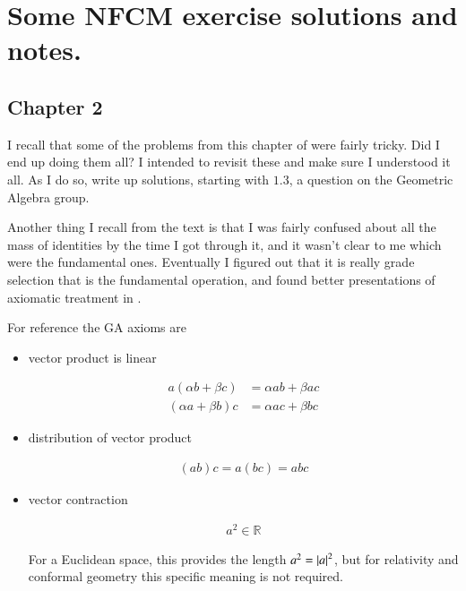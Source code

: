 \chapter{Some NFCM exercise solutions and notes. }
\label{chap:nfcmCh2}
\date{ Nov 27, 2008.  $RCSfile: nfcmCh2.tex,v $ Last $Revision: 1.12 $ $Date: 2009/08/20 02:40:11 $ }

\section{Chapter 2 }

I recall that some of the problems from this chapter of
\cite{hestenes1999nfc}
were fairly tricky.  Did I end up doing them all?  I intended to
revisit these and make sure I understood it all.  As I do so, write up
solutions, starting with $1.3$, a question on the Geometric Algebra group.

Another thing I recall from the text is that I was fairly confused about
all the mass of identities by the time I got through it, and it wasn't clear
to me which were the fundamental ones.
Eventually I figured out that it is
really grade selection that is the fundamental operation, and
found better presentations of axiomatic treatment in \cite{doran2003gap}.

For reference the GA axioms are

\begin{itemize}
\item vector product is linear

\begin{align}
a ( \alpha b + \beta c) &= \alpha a b + \beta a c \\
( \alpha a + \beta b) c &= \alpha a c + \beta b c
\end{align}

\item distribution of vector product

\begin{align}
(a b) c = a (b c) = a b c
\end{align}

\item vector contraction

\begin{align}\label{eqn:nfcm_ch2:contractionAxiom}
a^2 \in \mathbb{R}
\end{align}

For a Euclidean space, this provides the length $a^2 = \left\lvert{a}\right\rvert^2$, but for relativity and conformal geometry this specific meaning is not required.

\end{itemize}

